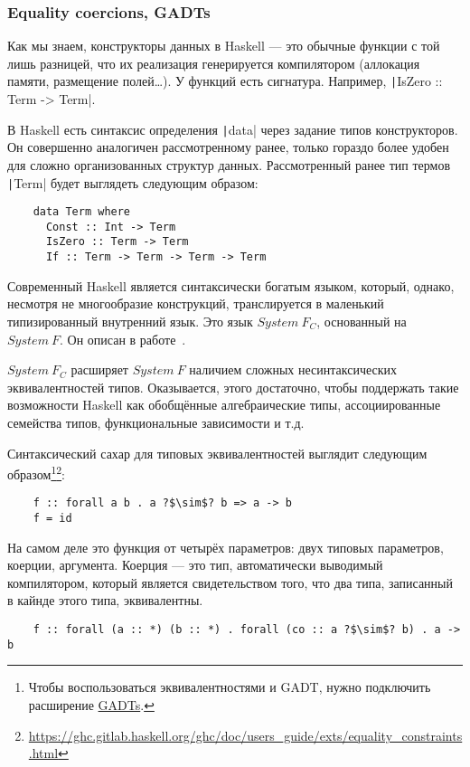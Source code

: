 \subsubsection{Equality coercions, GADTs} \label{subsubsec:gadts}

Как мы знаем, конструкторы данных в Haskell --- это обычные функции с той лишь разницей, что их реализация генерируется компилятором (аллокация памяти, размещение полей\ldots).
У функций есть сигнатура.
Например, \texttt|IsZero :: Term -> Term|.

В Haskell есть синтаксис определения \texttt|data| через задание типов конструкторов.
Он совершенно аналогичен рассмотренному ранее, только гораздо более удобен для сложно организованных структур данных.
Рассмотренный ранее тип термов \texttt|Term| будет выглядеть следующим образом:
\begin{verbatim}
    data Term where
      Const :: Int -> Term
      IsZero :: Term -> Term
      If :: Term -> Term -> Term -> Term
\end{verbatim}

Современный Haskell является синтаксически богатым языком, который, однако, несмотря не многообразие конструкций, транслируется в маленький типизированный внутренний язык.
Это язык $System~F_C$, основанный на $System~F$.
Он описан в работе~\cite{sulzmann2007system}.

$System~F_C$ расширяет $System~F$ наличием сложных несинтаксических эквивалентностей типов.
Оказывается, этого достаточно, чтобы поддержать такие возможности Haskell как обобщённые алгебраические типы, ассоциированные семейства типов, функциональные зависимости и т.д.

Синтаксический сахар для типовых эквивалентностей выглядит следующим образом\footnote{Чтобы воспользоваться эквивалентностями и GADT, нужно подключить расширение \href{https://downloads.haskell.org/~ghc/9.0.1/docs/html/users_guide/exts/gadt.html}{GADTs}.}\footnote{\url{https://ghc.gitlab.haskell.org/ghc/doc/users_guide/exts/equality_constraints.html}}:
\begin{verbatim}
    f :: forall a b . a ?$\sim$? b => a -> b
    f = id
\end{verbatim}
На самом деле это функция от четырёх параметров: двух типовых параметров, коерции, аргумента.
Коерция --- это тип, автоматически выводимый компилятором, который является свидетельством того, что два типа, записанный в кайнде этого типа, эквивалентны.
\begin{verbatim}
    f :: forall (a :: *) (b :: *) . forall (co :: a ?$\sim$? b) . a -> b
\end{verbatim}


